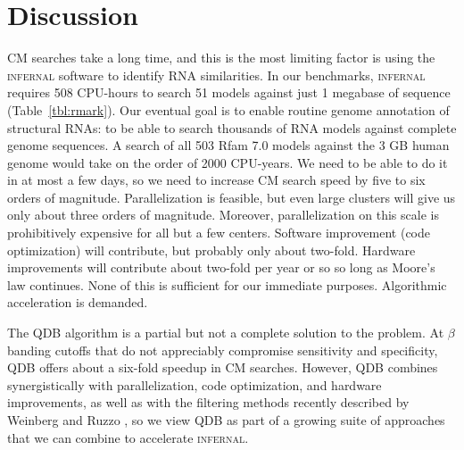 \documentclass[11pt]{article}
\newif\ifdraft
\begin{document}
\ifdraft

\fi


\section{Discussion}

CM searches take a long time, and this is the most limiting factor is
using the \textsc{infernal} software to identify RNA similarities. In
our benchmarks, \textsc{infernal} requires 508 CPU-hours to search 51
models against just 1 megabase of sequence
(Table~\ref{tbl:rmark}). Our eventual goal is to enable routine genome
annotation of structural RNAs: to be able to search thousands of RNA
models against complete genome sequences. A search of all 503 Rfam 7.0
models against the 3 GB human genome would take on the order of 2000
CPU-years. We need to be able to do it in at most a few days, so 
we need to increase CM search speed by five to six orders of
magnitude. Parallelization is feasible, but even large clusters will
give us only about three orders of magnitude.  Moreover,
parallelization on this scale is prohibitively expensive for all but a
few centers. Software improvement (code optimization) will
contribute, but probably only about two-fold.  Hardware improvements
will contribute about two-fold per year or so so long as Moore's law
continues. None of this is sufficient for our immediate purposes.
Algorithmic acceleration is demanded.

The QDB algorithm is a partial but not a complete solution to the
problem. At $\beta$ banding cutoffs that do not appreciably compromise
sensitivity and specificity, QDB offers about a six-fold
speedup in CM searches. However, QDB combines synergistically with
parallelization, code optimization, and hardware improvements, as well
as with the filtering methods recently described by Weinberg and Ruzzo
\cite{WeinbergRuzzo04,WeinbergRuzzo04b,WeinbergRuzzo06}, so we view QDB as part of a
growing suite of approaches that we can combine to accelerate
\textsc{infernal}.
\end{document}
